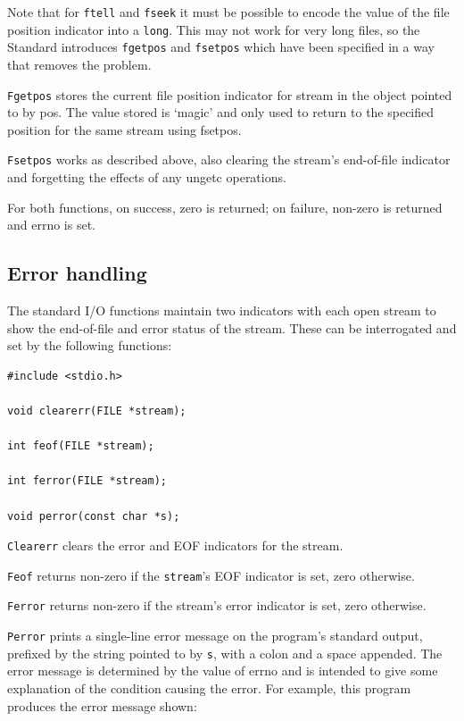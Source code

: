   Note that for \texttt{ftell} and \texttt{fseek} it must be
   possible to  encode the  value of the file position indicator into
   a \texttt{long}.  This may not work for very long files, so the Standard
   introduces \texttt{fgetpos}  and \texttt{fsetpos} which have been
   specified in a way that removes the problem.


  \texttt{Fgetpos} stores  the  current  file  position  indicator  for
   stream in the object pointed to by pos.  The value stored is `magic'
   and only used to return to  the  specified  position for the same stream
   using fsetpos.


  \texttt{Fsetpos} works as described above, also clearing the stream's
   end-of-file indicator  and  forgetting  the  effects of any ungetc
   operations.


  For  both  functions,  on  success,  zero  is  returned;  on failure,
   non-zero is returned and errno is set.


  \subsection{Error handling}
   

   The standard I/O functions maintain two indicators with each open stream
    to show the end-of-file and error status of the stream.  These can be
    interrogated and set by the following functions:


   \begin{Verbatim}
#include <stdio.h>

void clearerr(FILE *stream);

int feof(FILE *stream);

int ferror(FILE *stream);

void perror(const char *s);
\end{Verbatim}

   \texttt{Clearerr} clears the error and EOF indicators for the
    stream.


   \texttt{Feof} returns non-zero if the \texttt{stream}'s EOF
    indicator is  set, zero otherwise.


   \texttt{Ferror} returns non-zero if the stream's error indicator is
    set, zero otherwise.


   \texttt{Perror} prints a single-line error message on the program's
    standard  output, prefixed by the string pointed to by \texttt{s},
    with a colon and a space appended.  The error message is determined by
    the value of errno and is intended to give some explanation of the
    condition causing the error.  For example, this program produces the
    error message shown:


